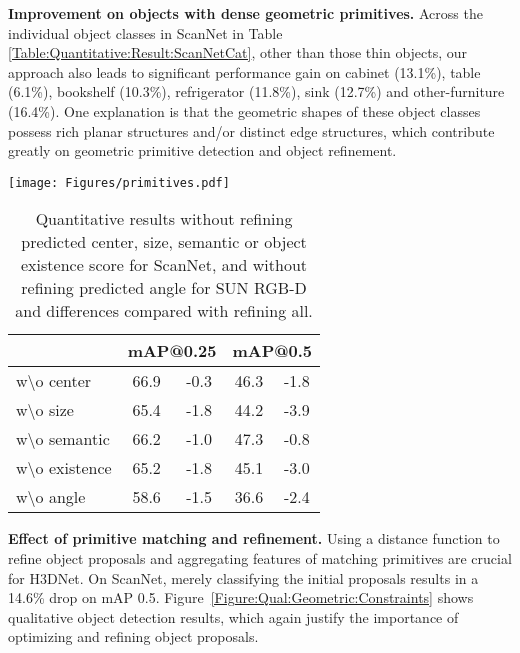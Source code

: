 \noindent\textbf{Improvement on objects with dense geometric primitives.}
Across the individual object classes in ScanNet in Table \ref{Table:Quantitative:Result:ScanNetCat}, other than those thin objects, our approach also leads to significant performance gain on cabinet (13.1\%), table (6.1\%), bookshelf (10.3\%), refrigerator (11.8\%), sink (12.7\%) and other-furniture (16.4\%). One explanation is that the geometric shapes of these object classes possess rich planar structures and/or distinct edge structures, which contribute greatly on geometric primitive detection and object refinement.

\begin{table*}[b!]
\begin{minipage}{0.48\textwidth}
  \centering
  \texttt{[image: Figures/primitives.pdf]}
  \label{Figure:Ablation:Primitive}
\end{minipage}
\hfill
\begin{minipage}{0.48\textwidth}
    \caption{Quantitative results without refining predicted center, size, semantic or object existence score for ScanNet, and without refining predicted angle for SUN RGB-D and differences compared with refining all.}
    \centering
  \begin{tabular}{l | c | c | c | c } 
 \hline
  & \multicolumn{2}{c}{mAP@0.25} & \multicolumn{2}{|c}{mAP@0.5} \\
 \hline
  w\textbackslash o center & 66.9 & -0.3 & 46.3 & -1.8\\ 
  w\textbackslash o size & 65.4 & -1.8 & 44.2 & -3.9\\ 
  w\textbackslash o semantic & 66.2 & -1.0 & 47.3 & -0.8\\ 
  w\textbackslash o existence & 65.2 & -1.8 & 45.1 & -3.0\\ 
  \hline\hline
  w\textbackslash o angle & 58.6 & -1.5 & 36.6 & -2.4 \\
  \hline
 \end{tabular}
\label{Table:Ablation:Refinement}
\end{minipage}
\end{table*}

\noindent\textbf{Effect of primitive matching and refinement.} Using a distance function to refine object proposals and aggregating features of matching primitives are crucial for H3DNet. On ScanNet, merely classifying the initial proposals results in a 14.6\% drop on mAP 0.5. Figure~\ref{Figure:Qual:Geometric:Constraints} shows qualitative object detection results, which again justify the importance of optimizing and refining object proposals. 

















